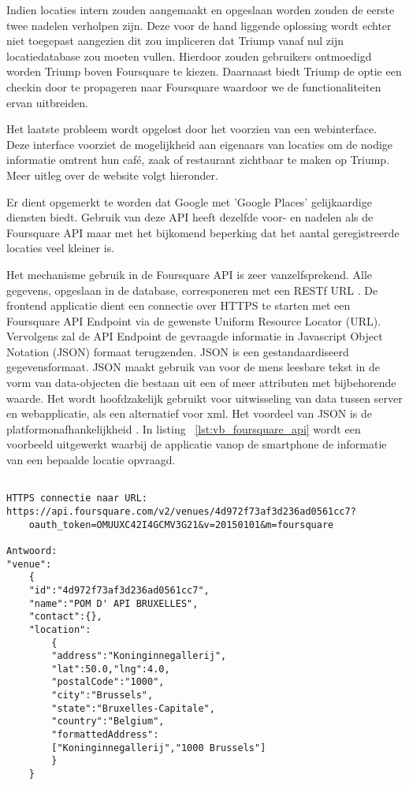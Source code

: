 Indien locaties intern zouden aangemaakt en opgeslaan worden zouden de eerste twee nadelen verholpen zijn. 
Deze voor de hand liggende oplossing wordt echter niet toegepast aangezien dit zou impliceren dat Triump vanaf nul zijn locatiedatabase zou moeten vullen. Hierdoor zouden gebruikers ontmoedigd worden Triump boven Foursquare te kiezen. Daarnaast biedt Triump de optie een checkin door te propageren naar Foursquare waardoor we de functionaliteiten ervan uitbreiden. 

Het laatste probleem wordt opgelost door het voorzien van een webinterface. Deze interface voorziet de mogelijkheid aan eigenaars van locaties om de nodige informatie omtrent hun café, zaak of restaurant zichtbaar te maken op Triump. Meer uitleg over de website volgt hieronder.

Er dient opgemerkt te worden dat Google met 'Google Places' gelijkaardige diensten biedt. Gebruik van deze API heeft dezelfde voor- en nadelen als de Foursquare API maar met het bijkomend beperking dat het aantal geregistreerde locaties veel kleiner is.


Het mechanisme gebruik in de Foursquare API is zeer vanzelfsprekend. Alle gegevens, opgeslaan in de database, corresponeren met een RESTf URL \cite{FS_API_website}. De frontend applicatie dient een connectie over HTTPS te starten met een Foursquare API Endpoint via de gewenste Uniform Resource Locator (URL). Vervolgens zal de API Endpoint de gevraagde informatie in Javascript Object Notation (JSON) formaat terugzenden. JSON is een gestandaardiseerd gegevensformaat. JSON maakt gebruik van voor de mens leesbare tekst in de vorm van data-objecten die bestaan uit een of meer attributen met bijbehorende waarde. Het wordt hoofdzakelijk gebruikt voor uitwisseling van data tussen server en webapplicatie, als een alternatief voor xml. Het voordeel van JSON is de platformonafhankelijkheid \cite{JSON_def}. In listing ~\ref{lst:vb_foursquare_api} wordt een voorbeeld uitgewerkt waarbij de applicatie vanop de smartphone de informatie van een bepaalde locatie opvraagd.


\begin{lstlisting}[caption={Voorbeeld: werking Foursquare API},label=lst:vb_foursquare_api]

HTTPS connectie naar URL:
https://api.foursquare.com/v2/venues/4d972f73af3d236ad0561cc7?
	oauth_token=OMUUXC42I4GCMV3G21&v=20150101&m=foursquare

Antwoord:
"venue":
	{
	"id":"4d972f73af3d236ad0561cc7",
	"name":"POM D' API BRUXELLES",
	"contact":{},
	"location":
		{
		"address":"Koninginnegallerij",
		"lat":50.0,"lng":4.0,
		"postalCode":"1000",
		"city":"Brussels",
		"state":"Bruxelles-Capitale",
		"country":"Belgium",
		"formattedAddress":
		["Koninginnegallerij","1000 Brussels"]
		}
	}
\end{lstlisting}
 


